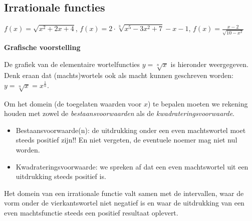 \subsection{Irrationale functies}

\begin{voorbeeld}
	$f(x)=\sqrt{x^{2}+2x+4}$, $f(x)=2\cdot \sqrt[3]{x^{5}-3x^{2}+7}-x-1$,
$f(x)=\frac{x-2}{\sqrt{10-x^{2}}}$
\end{voorbeeld}

\textbf{Grafische voorstelling}

De grafiek van de elementaire wortelfuncties $y=\sqrt[n]{x}$
is hieronder weergegeven. Denk eraan dat (machts)wortels ook als macht
kunnen geschreven worden: $y=\sqrt[n]{x}=x^{\frac{1}{n}}$.


Om het domein (de toegelaten waarden voor $x$) te bepalen moeten
we rekening houden met zowel de \emph{bestaansvoorwaarden} als de
\emph{kwadrateringsvoorwaarde}.

\begin{itemize}
	\item Bestaansvoorwaarde(n): de uitdrukking onder een even machtswortel
moet steeds positief zijn!! En niet vergeten, de eventuele noemer
mag niet nul worden.
\item Kwadrateringsvoorwaarde: we spreken af dat een even machtswortel uit
een uitdrukking steeds positief is.
\end{itemize}

Het domein van een irrationale functie valt samen met de intervallen,
waar de vorm onder de vierkantswortel niet negatief is en waar de
uitdrukking van een even machtsfunctie steeds een positief resultaat
oplevert.

